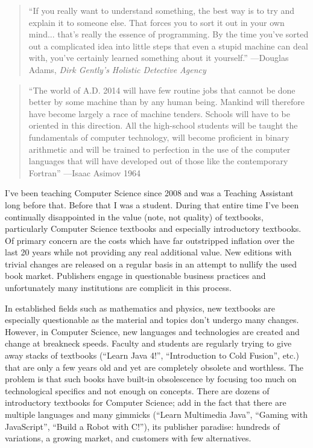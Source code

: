
\begin{quote}
``If you really want to understand something, the best way is to try and explain it to someone else. That forces you to sort it out in your own mind... that's really the essence of programming. By the time you've sorted out a complicated idea into little steps that even a stupid machine can deal with, you've certainly learned something about it yourself.'' ---Douglas Adams, \emph{Dirk Gently's Holistic Detective Agency} \cite{Adams1987}
\end{quote}

\begin{quote}
``The world of A.D. 2014 will have few routine jobs that cannot be done better by some machine than by any human being. Mankind will therefore have become largely a race of machine tenders. Schools will have to be oriented in this direction. All the high-school students will be taught the fundamentals of computer technology, will become proficient in binary arithmetic and will be trained to perfection in the use of the computer languages that will have developed out of those like the contemporary Fortran''
---Isaac Asimov 1964
\end{quote}

I've been teaching Computer Science since 2008 and was a Teaching Assistant long before that.  Before that
I was a student.  During that entire time I've been continually disappointed in the value (note, not quality) of
textbooks, particularly Computer Science textbooks and especially introductory textbooks.  Of primary concern
are the costs which have far outstripped inflation over the last 20 years while not providing any 
real additional value.  New editions with trivial changes are released on a regular basis in an attempt to
nullify the used book market.  Publishers engage in questionable business practices and unfortunately many
institutions are complicit in this process.

In established fields such as mathematics and physics, new textbooks are especially questionable as the
material and topics don't undergo many changes.  However, in Computer Science, new languages and
technologies are created and change at breakneck speeds.  Faculty and students are regularly trying to
give away stacks of textbooks (``Learn Java 4!'', ``Introduction to Cold Fusion'', etc.) that are only a few
years old and yet are completely obsolete and worthless.  The problem is that such books have built-in
obsolescence by focusing too much on technological specifics and not enough on concepts.  There are
dozens of introductory textbooks for Computer Science; add in the fact that there are multiple languages
and many gimmicks (``Learn Multimedia Java'', ``Gaming with JavaScript'', ``Build a Robot with C!''), its
publisher paradise: hundreds of variations, a growing market, and customers with few alternatives.

